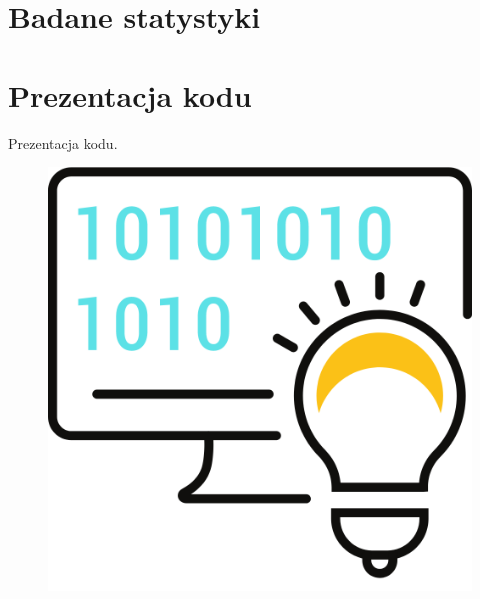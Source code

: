 \documentclass{beamer}
\begin{document}
\section{Badane statystyki}
\begin{frame}
		
\end{frame}
\begin{frame}
	
\end{frame}

\section{Prezentacja kodu}
\begin{frame}
	\begin{center}
		\huge{Prezentacja kodu.}
	\end{center}
	\begin{figure}
		\centering
		\includegraphics[width=0.5\linewidth]{../images/rys_6}
		\label{fig:rys6}
	\end{figure}
\end{frame}
\end{document}
